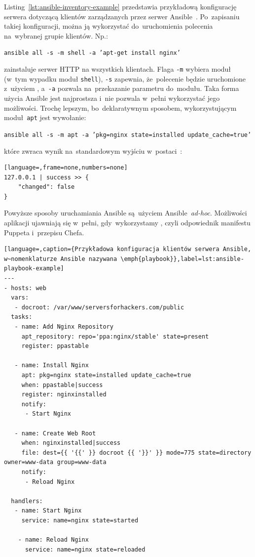 \documentclass[thesis]{subfiles}
\begin{document}
Listing~\ref{lst:ansible-inventory-example} przedstawia przykładową konfigurację serwera dotyczącą klientów zarządzanych przez serwer Ansible~\cite{ansible-example}. Po~zapisaniu takiej konfiguracji, można ją wykorzystać do~uruchomienia polecenia na~wybranej grupie klientów. Np.:\mynobreakpar
\begin{center}
\texttt{ansible all -s -m shell -a 'apt-get install nginx'}
\end{center}
zainstaluje serwer HTTP  na wszystkich klientach. Flaga \texttt{-m} wybiera moduł (w~tym wypadku moduł \texttt{shell}), \texttt{-s} zapewnia, że~polecenie będzie uruchomione z~użyciem , a~\texttt{-a} pozwala na~przekazanie parametru do~modułu. Taka forma użycia Ansible jest najprostsza i~nie pozwala w~pełni wykorzystać jego możliwości. Trochę lepszym, bo~deklaratywnym sposobem, wykorzystującym moduł~\texttt{apt} jest wywołanie:\mynobreakpar
\begin{center}
\texttt{ansible all -s -m apt -a 'pkg=nginx state=installed update\_cache=true'}
\end{center}
które zwraca wynik na~standardowym wyjściu w~postaci~\json{}:\mynobreakpar
\begin{lstlisting}[language=,frame=none,numbers=none]
127.0.0.1 | success >> {
    "changed": false
}
\end{lstlisting}

Powyższe sposoby uruchamiania Ansible są~użyciem Ansible~\emph{ad-hoc}. Możliwości aplikacji ujawniają się w~pełni, gdy~wykorzystamy , czyli odpowiednik manifestu Puppeta i~przepisu Chefa.

\begin{lstlisting}[language=,caption={Przykładowa konfiguracja klientów serwera Ansible, w~nomenklaturze Ansible nazywana \emph{playbook}},label=lst:ansible-playbook-example]
---
- hosts: web
  vars:
   - docroot: /var/www/serversforhackers.com/public
  tasks:
   - name: Add Nginx Repository
     apt_repository: repo='ppa:nginx/stable' state=present
     register: ppastable

   - name: Install Nginx
     apt: pkg=nginx state=installed update_cache=true
     when: ppastable|success
     register: nginxinstalled
     notify:
      - Start Nginx

   - name: Create Web Root
     when: nginxinstalled|success
     file: dest={{ '{{' }} docroot {{ '}}' }} mode=775 state=directory owner=www-data group=www-data
     notify:
      - Reload Nginx

  handlers:
   - name: Start Nginx
     service: name=nginx state=started

    - name: Reload Nginx
      service: name=nginx state=reloaded
\end{lstlisting}
\end{document}
